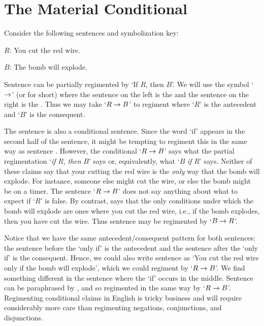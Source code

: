 \section{The Material Conditional}
  \label{sec.conditional}

Consider the following sentences and symbolization key:

\begin{earg} \label{bomb}
\end{earg}

\begin{ekey}
\item[$R$:] You cut the red wire.
\item[$B$:] The bomb will explode.
\end{ekey}

Sentence  can be partially regimented by `If $R$, then $B$'.
We will use the  symbol `$\rightarrow$' (or  for short) where the sentence on the left is the  and the sentence on the right is the .
Thus we may take `$R\rightarrow B$' to regiment  where `$R$' is the antecedent and `$B$' is the consequent.

The sentence  is also a conditional sentence.
Since the word `if' appears in the second half of the sentence, it might be tempting to regiment this in the same way as sentence .
However, the conditional `$R \rightarrow B$' says what the partial regimentation `\textit{if} $R$, \textit{then} $B$' says or, equivalently, what `$B$ \textit{if} $R$' says. 
Neither of these claims say that your cutting the red wire is the \textit{only} way that the bomb will explode.
For instance, someone else might cut the wire, or else the bomb might be on a timer.
The sentence `$R\rightarrow B$' does not say anything about what to expect if `$R$' is false. 
By contrast,  says that the only conditions under which the bomb will explode are ones where you cut the red wire, i.e., if the bomb explodes, then you have cut the wire.
Thus sentence  may be regimented by `$B \rightarrow R$'. 

Notice that we have the same antecedent/consequent pattern for both sentences: the sentence before the `only if' is the antecedent and the sentence after the `only if' is the consequent.
Hence, we could also write sentence  as `You cut the red wire only if the bomb will explode', which we could regiment by `$R\rightarrow B$'.
We find something different in the sentence  where the `if' occurs in the middle.
Sentence  can be paraphrased by , and so regimented in the same way by `$R \rightarrow B$'.
Regimenting conditional claims in English is tricky business and will require considerably more care than regimenting negations, conjunctions, and disjunctions.

